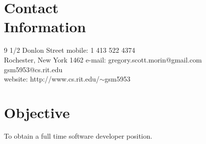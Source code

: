 \documentclass[margin,line]{resume}
\begin{document}
\begin{resume}

    \section{\mysidestyle Contact\\Information}

    9 1/2 Donlon Street           \hfill mobile: 1 413 522 4374   \vspace{0mm}\\\vspace{0mm}%
    Rochester, New York 1462      \hfill e-mail: gregory.scott.morin@gmail.com  \vspace{0mm}\\\vspace{0mm}%
                                  \hfill         gsm5953@cs.rit.edu  \vspace{0mm}\\\vspace{-4.5mm}%
                                  \hfill website: http://www.cs.rit.edu/$\sim$gsm5953   \vspace{0mm}\\\vspace{-4.5mm}%

    \section{\mysidestyle Objective} 
    To obtain a full time software developer position. 




\end{resume}
\end{document}
